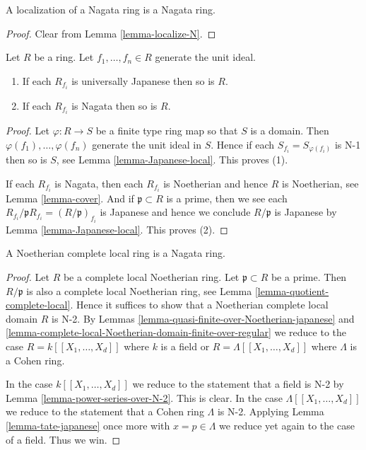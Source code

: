 \begin{lemma}
\label{lemma-nagata-localize}
A localization of a Nagata ring is a Nagata ring.
\end{lemma}

\begin{proof}
Clear from Lemma \ref{lemma-localize-N}.
\end{proof}

\begin{lemma}
\label{lemma-nagata-local}
Let $R$ be a ring. Let $f_1, \ldots, f_n \in R$ generate the
unit ideal.
\begin{enumerate}
\item  If each $R_{f_i}$ is universally Japanese then so is $R$.
\item  If each $R_{f_i}$ is Nagata then so is $R$.
\end{enumerate}
\end{lemma}

\begin{proof}
Let $\varphi : R \to S$ be a finite type ring map so that $S$ is a domain.
Then $\varphi(f_1), \ldots, \varphi(f_n)$ generate the unit ideal
in $S$. Hence if each $S_{f_i} = S_{\varphi(f_i)}$ is N-1 then so is
$S$, see Lemma \ref{lemma-Japanese-local}. This proves (1).

\medskip\noindent
If each $R_{f_i}$ is Nagata, then each $R_{f_i}$ is Noetherian and
hence $R$ is Noetherian, see Lemma \ref{lemma-cover}. And if
$\mathfrak p \subset R$ is a prime, then we see each
$R_{f_i}/\mathfrak pR_{f_i} = (R/\mathfrak p)_{f_i}$ is Japanese
and hence we conclude $R/\mathfrak p$ is Japanese by
Lemma \ref{lemma-Japanese-local}. This proves (2).
\end{proof}

\begin{lemma}
\label{lemma-Noetherian-complete-local-Nagata}
A Noetherian complete local ring is a Nagata ring.
\end{lemma}

\begin{proof}
Let $R$ be a complete local Noetherian ring.
Let $\mathfrak p \subset R$ be a prime.
Then $R/\mathfrak p$ is also a complete local Noetherian ring,
see Lemma \ref{lemma-quotient-complete-local}.
Hence it suffices to show that a Noetherian complete local
domain $R$ is N-2. By
Lemmas \ref{lemma-quasi-finite-over-Noetherian-japanese}
and \ref{lemma-complete-local-Noetherian-domain-finite-over-regular}
we reduce to the case $R = k[[X_1, \ldots, X_d]]$ where $k$ is a field or
$R = \Lambda[[X_1, \ldots, X_d]]$ where $\Lambda$ is a Cohen ring.

\medskip\noindent
In the case $k[[X_1, \ldots, X_d]]$ we reduce to the statement that a
field is N-2 by Lemma \ref{lemma-power-series-over-N-2}. This is clear.
In the case $\Lambda[[X_1, \ldots, X_d]]$ we reduce to the statement
that a Cohen ring $\Lambda$ is N-2. Applying Lemma \ref{lemma-tate-japanese}
once more with $x = p \in \Lambda$ we reduce yet again to the case
of a field. Thus we win.
\end{proof}

